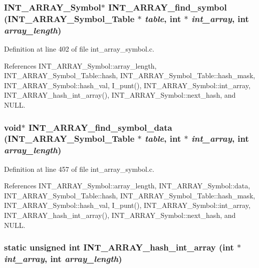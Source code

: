 \subsubsection{\setlength{\rightskip}{0pt plus 5cm}\bf{INT\_\-ARRAY\_\-Symbol}$\ast$ INT\_\-ARRAY\_\-find\_\-symbol (\bf{INT\_\-ARRAY\_\-Symbol\_\-Table} $\ast$ {\em table}, int $\ast$ {\em int\_\-array}, int {\em array\_\-length})}\label{int__array__symbol_8c_9b846e6e16887ccf4d75d254cb8256e4}




Definition at line 402 of file int\_\-array\_\-symbol.c.

References INT\_\-ARRAY\_\-Symbol::array\_\-length, INT\_\-ARRAY\_\-Symbol\_\-Table::hash, INT\_\-ARRAY\_\-Symbol\_\-Table::hash\_\-mask, INT\_\-ARRAY\_\-Symbol::hash\_\-val, I\_\-punt(), INT\_\-ARRAY\_\-Symbol::int\_\-array, INT\_\-ARRAY\_\-hash\_\-int\_\-array(), INT\_\-ARRAY\_\-Symbol::next\_\-hash, and NULL.
\subsubsection{\setlength{\rightskip}{0pt plus 5cm}void$\ast$ INT\_\-ARRAY\_\-find\_\-symbol\_\-data (\bf{INT\_\-ARRAY\_\-Symbol\_\-Table} $\ast$ {\em table}, int $\ast$ {\em int\_\-array}, int {\em array\_\-length})}\label{int__array__symbol_8c_1d9cc88d4a195673ae9018df1643ae67}




Definition at line 457 of file int\_\-array\_\-symbol.c.

References INT\_\-ARRAY\_\-Symbol::array\_\-length, INT\_\-ARRAY\_\-Symbol::data, INT\_\-ARRAY\_\-Symbol\_\-Table::hash, INT\_\-ARRAY\_\-Symbol\_\-Table::hash\_\-mask, INT\_\-ARRAY\_\-Symbol::hash\_\-val, I\_\-punt(), INT\_\-ARRAY\_\-Symbol::int\_\-array, INT\_\-ARRAY\_\-hash\_\-int\_\-array(), INT\_\-ARRAY\_\-Symbol::next\_\-hash, and NULL.
\subsubsection{\setlength{\rightskip}{0pt plus 5cm}static unsigned int INT\_\-ARRAY\_\-hash\_\-int\_\-array (int $\ast$ {\em int\_\-array}, int {\em array\_\-length})\hspace{0.3cm}{\tt  [static]}}\label{int__array__symbol_8c_1413942fcd06ab6f7f27382323c54c41}




